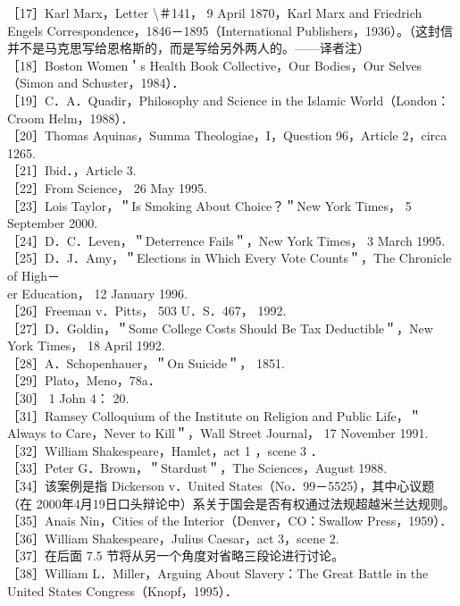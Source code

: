 ［17］Karl Marx，Letter \textbackslash ＃141， 9 April 1870，Karl Marx and Friedrich Engels Correspondence，1846－1895（International Publishers，1936）。（这封信并不是马克思写给恩格斯的，而是写给另外两人的。——译者注）\\
［18］Boston Women＇s Health Book Collective，Our Bodies，Our Selves（Simon and Schuster，1984）．\\
［19］C．A．Quadir，Philosophy and Science in the Islamic World（London：Croom Helm，1988）．\\
［20］Thomas Aquinas，Summa Theologiae，I，Question 96，Article 2，circa 1265.\\
［21］Ibid．，Article 3.\\
［22］From Science， 26 May 1995.\\
［23］Lois Taylor，＂Is Smoking About Choice？＂New York Times， 5 September 2000.\\
［24］D．C．Leven，＂Deterrence Fails＂，New York Times， 3 March 1995.\\
［25］D．J．Amy，＂Elections in Which Every Vote Counts＂，The Chronicle of High－\\
er Education， 12 January 1996.\\
［26］Freeman v．Pitts， 503 U．S．467， 1992.\\
［27］D．Goldin，＂Some College Costs Should Be Tax Deductible＂，New York Times， 18 April 1992.\\
［28］A．Schopenhauer，＂On Suicide＂， 1851.\\
［29］Plato，Meno，78a．\\
［30］ 1 John 4： 20.\\
［31］Ramsey Colloquium of the Institute on Religion and Public Life，＂Always to Care，Never to Kill＂，Wall Street Journal， 17 November 1991.\\
［32］William Shakespeare，Hamlet，act 1 ，scene 3 ．\\
［33］Peter G．Brown，＂Stardust＂，The Sciences，August 1988.\\
［34］该案例是指 Dickerson v．United States（No．99－5525），其中心议题（在 2000年4月19日口头辩论中）系关于国会是否有权通过法规超越米兰达规则。\\
［35］Anais Nin，Cities of the Interior（Denver，CO：Swallow Press，1959）．\\
［36］William Shakespeare，Julius Caesar，act 3，scene 2.\\
［37］在后面 7.5 节将从另一个角度对省略三段论进行讨论。\\
［38］William L．Miller，Arguing About Slavery：The Great Battle in the United States Congress（Knopf，1995）．\\
